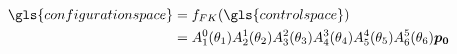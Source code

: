 \begin{equation}\label{eq:fk_mapping}
  \begin{aligned}
    \gls{configurationspace} &= f_{FK}(\gls{controlspace}) \\ 
              &= A_{1}^{0}(\theta_1) A_{2}^{1}(\theta_2) A_{3}^{2}(\theta_3) A_{4}^{3}(\theta_4) A_{5}^{4}(\theta_5) A_{6}^{5}(\theta_6) \vb*{p_0}
  \end{aligned}
\end{equation}
